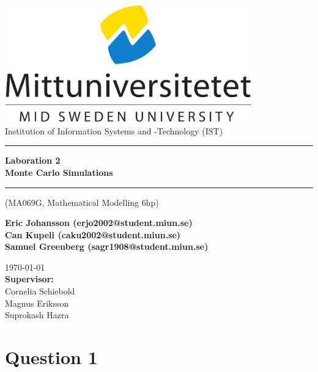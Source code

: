 \documentclass{article}
\makeatletter
\newcommand{\getauthor}{Eric Johansson (erjo2002@student.miun.se)\\Can Kupeli (caku2002@student.miun.se) \\Samuel Greenberg (sagr1908@student.miun.se)} %
\newcommand{\gettitle}{Laboration 2 \\Monte Carlo Simulations} %
\newcommand{\getcourse}{(MA069G, Mathematical Modelling 6hp)} %
\newcommand{\getsupervisor}{Cornelia Schiebold\\Magnus Eriksson\\Suprokash Hazra}
\makeatother
\begin{document}
\begin{titlepage}
	\begin{center}
		\vspace*{1cm}

		\includegraphics[width=0.8\textwidth]{imgs/msu.png}\\[0.5cm]
		\Large
		Institution of Information Systems and -Technology (IST)\\[1cm]
		\Huge
		\rule{\textwidth}{1px}
		\textbf{\gettitle}
		\rule[0.5cm]{\textwidth}{1px}

		\large
		\getcourse{}
		\vspace{1cm}

		\Large
		\textbf{\getauthor}\\

		\vfill


		\vspace{0.8cm}

		\small
		\today \\
		\Large
		\textbf{Supervisor:}\\
		\getsupervisor{}

	\end{center}
\end{titlepage}
\tableofcontents
\newpage
{}


\section{Question 1}
\end{document}
